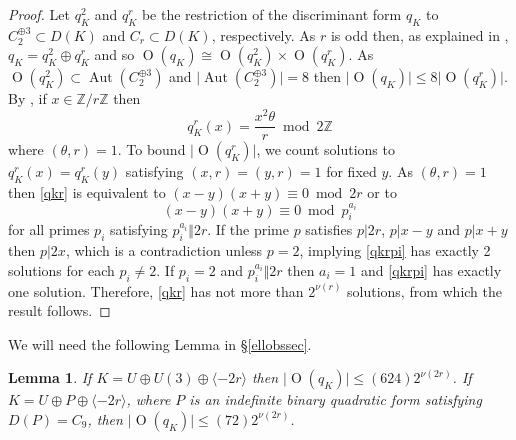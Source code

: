 \documentclass[12pt, a4paper]{article}
\newtheorem{lemma}[thm]{Lemma}
\newcommand{\ZZ}{\mathbb{Z}}
\newcommand{\la}{\langle}
\newcommand{\ra}{\rangle}
\newcommand{\opn}{\operatorname}
\newcommand{\op}{\oplus}
\begin{document}
\begin{proof}
  Let $q_K^2$ and $q_K^r$ be the restriction of the discriminant form $q_K$ to $C_2^{\op 3} \subset D(K)$ and $C_r \subset D(K)$, respectively.
  As $r$ is odd then, as explained in \cite[\S1]{Nikulin}, 
$q_K = q_K^2 \op q_K^r$ 
  and so  $\opn{O}(q_K) \cong \opn{O}(q_K^2) \times \opn{O}(q_K^r)$.
  As $\opn{O}(q_K^2) \subset \opn{Aut}(C_2^{\op 3})$ and $\vert \opn{Aut}(C_2^{\op 3}) \vert = 8$ then $\vert \opn{O}(q_K) \vert \leq 8 \vert \opn{O}(q_K^r) \vert$.
  By \cite[Proposition 1.8.1]{Nikulin}, if $x \in \ZZ/r \ZZ$ then
  \begin{equation}\label{qkr}
    q_K^r(x) = \frac{x^2 \theta}{r} \bmod{ 2 \ZZ}
  \end{equation}
  where $(\theta, r)=1$.
  To bound $\vert \opn{O}(q_K^r) \vert$, we count solutions to $q_K^r(x)=q_K^r(y)$ satisfying $(x,r)=(y,r)=1$ for fixed $y$.
  As $(\theta, r)=1$ then \eqref{qkr} is equivalent to  $(x-y)(x+y) \equiv 0 \bmod{ 2r}$ or to 
  \begin{equation}\label{qkrpi}
    (x-y)(x+y) \equiv 0 \bmod{ p_i^{a_i}}
  \end{equation}
  for all primes $p_i$ satisfying $p_i^{a_i} \Vert 2r$.
  If the prime $p$ satisfies $p \vert 2r$, $p \vert x-y$ and $p \vert x+y$ then $p \vert 2x$, which is a contradiction unless $p=2$, implying \eqref{qkrpi} has exactly 2 solutions for each $p_i \neq 2$.
  If $p_i=2$ and $p_i^{a_i} \Vert 2r$ then $a_i=1$ and \eqref{qkrpi} has exactly one solution.
  Therefore, \eqref{qkr} has not more than $2^{\nu(r)}$ solutions, from which the result follows.
\end{proof}
We will need the following Lemma in \S\ref{ellobssec}.
\begin{lemma}\label{Oqk2-3-lem}
  If $K = U \op U(3) \op \la -2r \ra$ then $\vert \opn{O}(q_K) \vert \leq (624) 2^{\nu(2r)}$.
  If $K = U \op P \op \la -2r \ra$, where $P$ is an indefinite binary quadratic form satisfying $D(P)=C_9$, then $\vert \opn{O}(q_K) \vert \leq (72) 2^{\nu(2r)}$.
\end{lemma}
\end{document}
